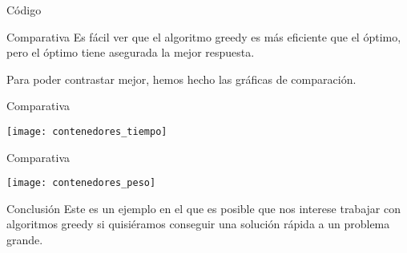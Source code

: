 \begin{frame}[fragile]{Código}
	\resizebox{10cm}{!}{
	}
\end{frame}

\begin{frame}{Comparativa}
	Es fácil ver que el algoritmo greedy es más eficiente que el óptimo, pero el óptimo tiene asegurada la mejor respuesta.
	
	Para poder contrastar mejor, hemos hecho las gráficas de comparación.
\end{frame}

\begin{frame}{Comparativa}
	\begin{center}
		\texttt{[image: contenedores\_tiempo]}
	\end{center}
\end{frame}

\begin{frame}{Comparativa}
	\begin{center}
		\texttt{[image: contenedores\_peso]}
	\end{center}
\end{frame}

\begin{frame}{Conclusión}
	Este es un ejemplo en el que es posible que nos interese trabajar con algoritmos greedy si quisiéramos conseguir una solución rápida a un problema grande.
\end{frame}